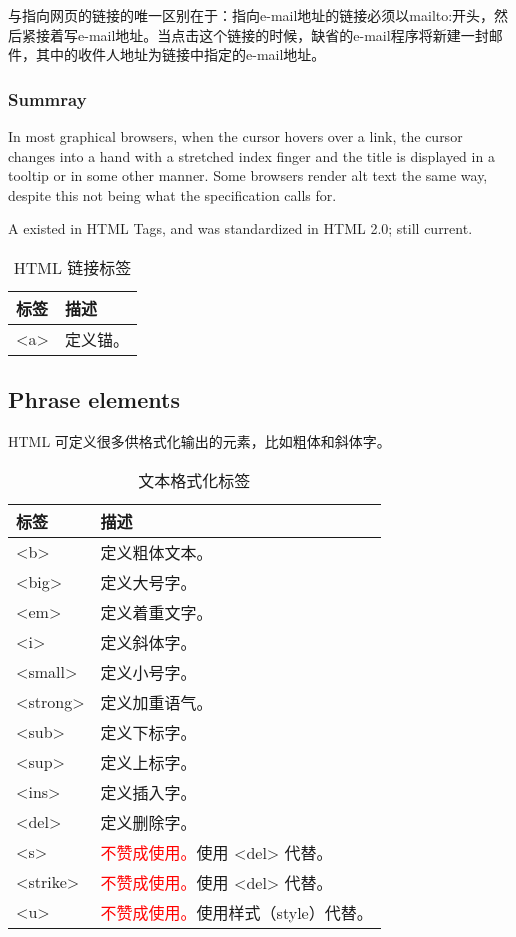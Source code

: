 与指向网页的链接的唯一区别在于：指向e-mail地址的链接必须以mailto:开头，然后紧接着写e-mail地址。当点击这个链接的时候，缺省的e-mail程序将新建一封邮件，其中的收件人地址为链接中指定的e-mail地址。


\subsubsection{Summray}


In most graphical browsers, when the cursor hovers over a link, the cursor changes into a hand with a stretched index finger and the title is displayed in a tooltip or in some other manner. Some browsers render alt text the same way, despite this not being what the specification calls for.

A existed in HTML Tags, and was standardized in HTML 2.0; still current.

\begin{table}[!h]
\centering
\caption{HTML 链接标签}
\begin{tabular}{|l|l|}
\hline
标签		&描述		\\
\hline
<a>		&定义锚。	\\
\hline
\end{tabular}
\end{table}





\subsection{Phrase elements}

HTML 可定义很多供格式化输出的元素，比如粗体和斜体字。

\begin{table}[!h]
\centering
\caption{文本格式化标签}
\begin{tabular}{|l|l|}
\hline
标签		&描述							\\
\hline
<b>		&定义粗体文本。					\\
\hline
<big>	&定义大号字。					\\
\hline
<em>	&定义着重文字。					\\
\hline
<i>		&定义斜体字。					\\
\hline
<small>	&定义小号字。					\\
\hline
<strong>	&定义加重语气。					\\
\hline
<sub>	&定义下标字。					\\
\hline
<sup>	&定义上标字。					\\
\hline
<ins>	&定义插入字。					\\
\hline
<del>	&定义删除字。					\\
\hline
<s>		&\textcolor{Red}{不赞成使用。}使用 <del> 代替。\\
\hline
<strike>	&\textcolor{Red}{不赞成使用。}使用 <del> 代替。\\
\hline
<u>		&\textcolor{Red}{不赞成使用。}使用样式（style）代替。\\
\hline
\end{tabular}
\end{table}



